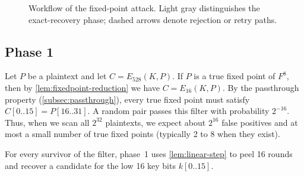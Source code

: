 \documentclass[version=preprint]{iacrcc}
\begin{document}
\begin{figure}[htbp]
\caption{Workflow of the fixed-point attack.
Light gray distinguishes the exact-recovery phase; dashed arrows denote rejection or retry paths.}
\label{fig:fixedpoint-workflow}
\end{figure}

\subsection{Phase 1}

Let $P$ be a plaintext and let $C = E_{528}(K,P)$.
If $P$ is a true fixed point of $F^8$, then by \autoref{lem:fixedpoint-reduction} we have $C = E_{16}(K,P)$.
By the passthrough property (\autoref{subsec:passthrough}), every true fixed point must satisfy
$C[0..15] = P[16..31].$
A random pair passes this filter with probability $2^{-16}$.
Thus, when we scan all $2^{32}$ plaintexts, we expect about $2^{16}$ false positives and at most a small number of true fixed points (typically 2 to 8 when they exist).

For every survivor of the filter, phase~1 uses \autoref{lem:linear-step} to peel 16 rounds and recover a candidate for the low 16 key bits $k[0..15]$.
\end{document}
